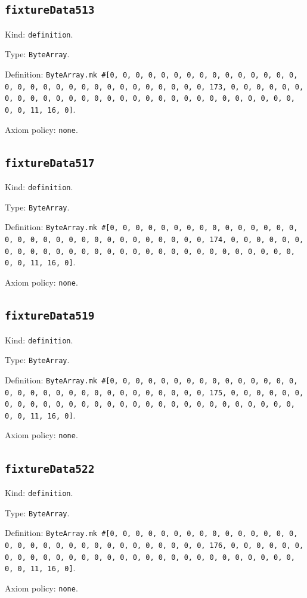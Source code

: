 \documentclass[11pt]{article}
\begin{document}
\subsection*{\texttt{fixtureData513}}
\noindent Kind: \texttt{definition}.\par
\noindent Type: \texttt{ByteArray}.\par
\noindent Definition: \texttt{ByteArray.mk \#[0, 0, 0, 0, 0, 0, 0, 0, 0, 0, 0, 0, 0, 0, 0, 0, 0, 0, 0, 0, 0, 0, 0, 0, 0, 0, 0, 0, 0, 0, 0, 173, 0, 0, 0, 0, 0, 0, 0, 0, 0, 0, 0, 0, 0, 0, 0, 0, 0, 0, 0, 0, 0, 0, 0, 0, 0, 0, 0, 0, 0, 0, 0, 11, 16, 0]}.\par
\noindent Axiom policy: \texttt{none}.\par
\subsection*{\texttt{fixtureData517}}
\noindent Kind: \texttt{definition}.\par
\noindent Type: \texttt{ByteArray}.\par
\noindent Definition: \texttt{ByteArray.mk \#[0, 0, 0, 0, 0, 0, 0, 0, 0, 0, 0, 0, 0, 0, 0, 0, 0, 0, 0, 0, 0, 0, 0, 0, 0, 0, 0, 0, 0, 0, 0, 174, 0, 0, 0, 0, 0, 0, 0, 0, 0, 0, 0, 0, 0, 0, 0, 0, 0, 0, 0, 0, 0, 0, 0, 0, 0, 0, 0, 0, 0, 0, 0, 11, 16, 0]}.\par
\noindent Axiom policy: \texttt{none}.\par
\subsection*{\texttt{fixtureData519}}
\noindent Kind: \texttt{definition}.\par
\noindent Type: \texttt{ByteArray}.\par
\noindent Definition: \texttt{ByteArray.mk \#[0, 0, 0, 0, 0, 0, 0, 0, 0, 0, 0, 0, 0, 0, 0, 0, 0, 0, 0, 0, 0, 0, 0, 0, 0, 0, 0, 0, 0, 0, 0, 175, 0, 0, 0, 0, 0, 0, 0, 0, 0, 0, 0, 0, 0, 0, 0, 0, 0, 0, 0, 0, 0, 0, 0, 0, 0, 0, 0, 0, 0, 0, 0, 11, 16, 0]}.\par
\noindent Axiom policy: \texttt{none}.\par
\subsection*{\texttt{fixtureData522}}
\noindent Kind: \texttt{definition}.\par
\noindent Type: \texttt{ByteArray}.\par
\noindent Definition: \texttt{ByteArray.mk \#[0, 0, 0, 0, 0, 0, 0, 0, 0, 0, 0, 0, 0, 0, 0, 0, 0, 0, 0, 0, 0, 0, 0, 0, 0, 0, 0, 0, 0, 0, 0, 176, 0, 0, 0, 0, 0, 0, 0, 0, 0, 0, 0, 0, 0, 0, 0, 0, 0, 0, 0, 0, 0, 0, 0, 0, 0, 0, 0, 0, 0, 0, 0, 11, 16, 0]}.\par
\noindent Axiom policy: \texttt{none}.\par
\end{document}
